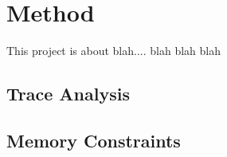 \section{Method}
This project is about blah.... blah blah blah

\subsection{Trace Analysis}

\subsection{Memory Constraints}
